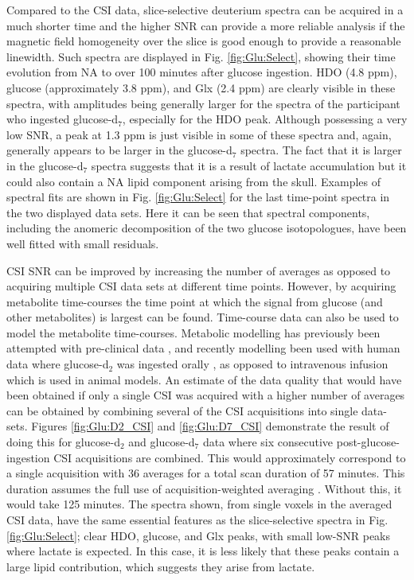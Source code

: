  Compared to the \ac{CSI} data, slice-selective deuterium spectra can be acquired in a much shorter time and the higher \ac{SNR} can provide a more reliable analysis if the magnetic field homogeneity over the slice is good enough to provide a reasonable linewidth. Such spectra are displayed in Fig. \ref{fig:Glu:Select}, showing their time evolution from \ac{NA} to over 100 minutes after glucose ingestion. HDO (4.8 ppm), glucose (approximately 3.8 ppm), and Glx (2.4 ppm) are clearly visible in these spectra, with amplitudes being generally larger for the spectra of the participant who ingested glucose-d$_7$, especially for the \ac{HDO} peak. Although possessing a very low \ac{SNR}, a peak at 1.3 ppm is just visible in some of these spectra and, again, generally appears to be larger in the glucose-d$_7$ spectra. The fact that it is larger in the glucose-d$_7$ spectra suggests that it is a result of lactate accumulation but it could also contain a \ac{NA} lipid component arising from the skull. Examples of spectral fits are shown in Fig. \ref{fig:Glu:Select} for the last time-point spectra in the two displayed data sets. Here it can be seen that spectral components, including the anomeric decomposition of the two glucose isotopologues, have been well fitted with small residuals.

\ac{CSI} \ac{SNR} can be improved by increasing the number of averages as opposed to acquiring multiple \ac{CSI} data sets at different time points. However, by acquiring metabolite time-courses the time point at which the signal from glucose (and other metabolites) is largest can be found. Time-course data can also be used to model the metabolite time-courses. Metabolic modelling has previously been attempted with pre-clinical data \cite{Lu2017QuantitativeSpectroscopy, Rich20201HVivo, Kreis2020MeasuringMRI, Simoes2022GlucoseGlioblastoma}, and recently modelling been used with human data where glucose-d$_2$ was ingested orally \cite{Ruhm2022Dynamic9.4T}, as opposed to intravenous infusion which is used in animal models. An estimate of the data quality that would have been obtained if only a single \ac{CSI} was acquired with a higher number of averages can be obtained by combining several of the \ac{CSI} acquisitions into single data-sets. Figures \ref{fig:Glu:D2_CSI} and \ref{fig:Glu:D7_CSI} demonstrate the result of doing this for glucose-d$_2$ and glucose-d$_7$ data where six consecutive post-glucose-ingestion \ac{CSI} acquisitions are combined. This would approximately correspond to a single acquisition with 36 averages for a total scan duration of 57 minutes. This duration assumes the full use of acquisition-weighted averaging \cite{Pohmann2001AccurateCSI}. Without this, it would take 125 minutes. The spectra shown, from single voxels in the averaged \ac{CSI} data, have the same essential features as the slice-selective spectra in Fig. \ref{fig:Glu:Select}; clear \ac{HDO}, glucose, and Glx peaks, with small low-\ac{SNR} peaks where lactate is expected. In this case, it is less likely that these peaks contain a large lipid contribution, which suggests they arise from lactate. 

